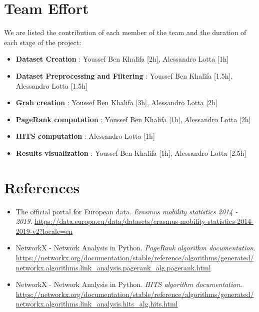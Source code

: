     \section{Team Effort}
    We are listed the contribution of each member of the team and the duration of each stage of the project:
    \begin{itemize}
      \item \textbf{Dataset Creation} : Youssef Ben Khalifa [2h], Alessandro Lotta [1h]
      \item \textbf{Dataset Preprocessing and Filtering} : Youssef Ben Khalifa [1.5h], Alessandro Lotta [1.5h]
      \item \textbf{Grah creation} : Youssef Ben Khalifa [3h], Alessandro Lotta [2h]
      \item \textbf{PageRank computation} : Youssef Ben Khalifa [1h], Alessandro Lotta [2h]
      \item \textbf{HITS computation} : Alessandro Lotta [1h]
      \item \textbf{Results visualization} : Youssef Ben Khalifa [1h], Alessandro Lotta [2.5h]
    \end{itemize}
  \section{References}
    \begin{itemize}
        \item The official portal for European data. \textit{Erasmus mobility statistics 2014 - 2019}. \url{https://data.europa.eu/data/datasets/erasmus-mobility-statistics-2014-2019-v2?locale=en} 
        \item NetworkX - Network Analysis in Python. \textit{PageRank algorithm documentation}. \url{https://networkx.org/documentation/stable/reference/algorithms/generated/networkx.algorithms.link_analysis.pagerank_alg.pagerank.html}
        \item NetworkX - Network Analysis in Python. \textit{HITS algorithm documentation}. \url{https://networkx.org/documentation/stable/reference/algorithms/generated/networkx.algorithms.link_analysis.hits_alg.hits.html}
    \end{itemize}
    